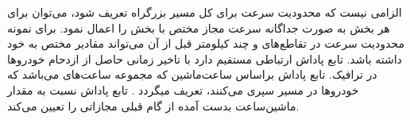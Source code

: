 الزامی نیست که محدودیت سرعت برای کل مسیر بزرگراه تعریف شود، می‌توان برای هر بخش به صورت جداگانه سرعت مجاز مختص با بخش را اعمال نمود. برای نمونه محدودیت سرعت در تقاطع‌های و چند کیلومتر قبل از آن می‌تواند مقادیر مختص به خود داشته باشد.
تابع پاداش ارتباطی مستقیم دارد با تاخیر زمانی حاصل از ازدحام خودروها در ترافیک. تابع پاداش براساس ساعت‌ماشین‌ که مجموعه ساعت‌های می‌باشد که خودروها در مسیر سپری می‌کنند، تعریف میگردد \cite{Zhang2006}.
تابع پاداش نسبت به مقدار ماشین‌ساعت بدست آمده از گام قبلی مجازاتی را تعیین می‌کند.




